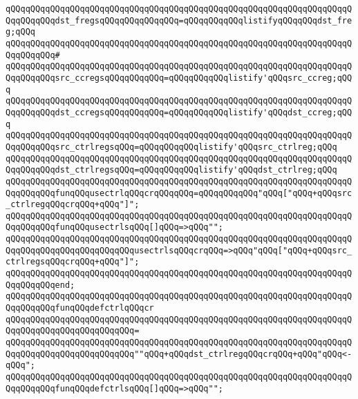 \verb|qQQqqQQqqQQqqQQqqQQqqQQqqQQqqQQqqQQqqQQqqQQqqQQqqQQqqQQqqQQqqQQqqQQqqQQqqQQqqQQqdst_fregsqQQqqQQqqQQqqQQq=qQQqqQQqqQQqlistifyqQQqqQQqdst_freg;qQQq|\newline
\verb|qQQqqQQqqQQqqQQqqQQqqQQqqQQqqQQqqQQqqQQqqQQqqQQqqQQqqQQqqQQqqQQqqQQqqQQqqQQqqQQq#|\newline
\verb|qQQqqQQqqQQqqQQqqQQqqQQqqQQqqQQqqQQqqQQqqQQqqQQqqQQqqQQqqQQqqQQqqQQqqQQqqQQqqQQqsrc_ccregsqQQqqQQqqQQq=qQQqqQQqqQQqlistify'qQQqsrc_ccreg;qQQq|\newline
\verb|qQQqqQQqqQQqqQQqqQQqqQQqqQQqqQQqqQQqqQQqqQQqqQQqqQQqqQQqqQQqqQQqqQQqqQQqqQQqqQQqdst_ccregsqQQqqQQqqQQq=qQQqqQQqqQQqlistify'qQQqdst_ccreg;qQQq|\newline
\verb|qQQqqQQqqQQqqQQqqQQqqQQqqQQqqQQqqQQqqQQqqQQqqQQqqQQqqQQqqQQqqQQqqQQqqQQqqQQqqQQqsrc_ctrlregsqQQq=qQQqqQQqqQQqlistify'qQQqsrc_ctrlreg;qQQq|\newline
\verb|qQQqqQQqqQQqqQQqqQQqqQQqqQQqqQQqqQQqqQQqqQQqqQQqqQQqqQQqqQQqqQQqqQQqqQQqqQQqqQQqdst_ctrlregsqQQq=qQQqqQQqqQQqlistify'qQQqdst_ctrlreg;qQQq|\newline
\newline
\verb|qQQqqQQqqQQqqQQqqQQqqQQqqQQqqQQqqQQqqQQqqQQqqQQqqQQqqQQqqQQqqQQqqQQqqQQqqQQqqQQqfunqQQqusectrlqQQqcrqQQqqQQq=qQQqqQQqqQQq"qQQq["qQQq+qQQqsrc_ctrlregqQQqcrqQQq+qQQq"]";|\newline
\newline
\verb|qQQqqQQqqQQqqQQqqQQqqQQqqQQqqQQqqQQqqQQqqQQqqQQqqQQqqQQqqQQqqQQqqQQqqQQqqQQqqQQqfunqQQqusectrlsqQQq[]qQQq=>qQQq"";|\newline
\verb|qQQqqQQqqQQqqQQqqQQqqQQqqQQqqQQqqQQqqQQqqQQqqQQqqQQqqQQqqQQqqQQqqQQqqQQqqQQqqQQqqQQqqQQqqQQqqQQqusectrlsqQQqcrqQQq=>qQQq"qQQq["qQQq+qQQqsrc_ctrlregsqQQqcrqQQq+qQQq"]";|\newline
\verb|qQQqqQQqqQQqqQQqqQQqqQQqqQQqqQQqqQQqqQQqqQQqqQQqqQQqqQQqqQQqqQQqqQQqqQQqqQQqqQQqend;|\newline
\newline
\verb|qQQqqQQqqQQqqQQqqQQqqQQqqQQqqQQqqQQqqQQqqQQqqQQqqQQqqQQqqQQqqQQqqQQqqQQqqQQqqQQqfunqQQqdefctrlqQQqcr|\newline
\verb|qQQqqQQqqQQqqQQqqQQqqQQqqQQqqQQqqQQqqQQqqQQqqQQqqQQqqQQqqQQqqQQqqQQqqQQqqQQqqQQqqQQqqQQqqQQqqQQq=|\newline
\verb|qQQqqQQqqQQqqQQqqQQqqQQqqQQqqQQqqQQqqQQqqQQqqQQqqQQqqQQqqQQqqQQqqQQqqQQqqQQqqQQqqQQqqQQqqQQqqQQq""qQQq+qQQqdst_ctrlregqQQqcrqQQq+qQQq"qQQq<-qQQq";|\newline
\newline
\verb|qQQqqQQqqQQqqQQqqQQqqQQqqQQqqQQqqQQqqQQqqQQqqQQqqQQqqQQqqQQqqQQqqQQqqQQqqQQqqQQqfunqQQqdefctrlsqQQq[]qQQq=>qQQq"";|\newline
